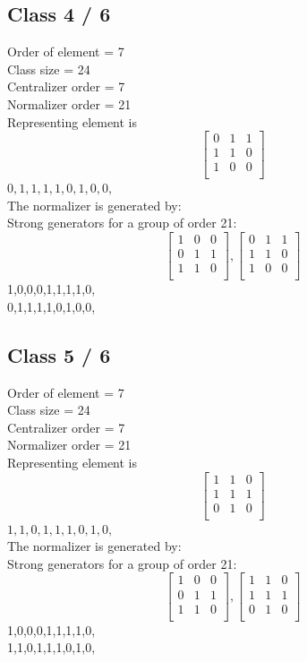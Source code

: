 \subsection*{Class 4 / 6}
Order of element = 7\\
Class size = 24\\
Centralizer order = 7\\
Normalizer order = 21\\
Representing element is
$$
\left[
\begin{array}{*{3}{r}}
0 & 1 & 1\\
1 & 1 & 0\\
1 & 0 & 0\\
\end{array}
\right]
$$
$0,1,1,1,1,0,1,0,0,$\\
The normalizer is generated by:\\
Strong generators for a group of order 21:
$$
\left[
\begin{array}{*{3}{r}}
1 & 0 & 0\\
0 & 1 & 1\\
1 & 1 & 0\\
\end{array}
\right]
, 
\left[
\begin{array}{*{3}{r}}
0 & 1 & 1\\
1 & 1 & 0\\
1 & 0 & 0\\
\end{array}
\right]
$$
1,0,0,0,1,1,1,1,0,\\
0,1,1,1,1,0,1,0,0,\\
\bigskip
\subsection*{Class 5 / 6}
Order of element = 7\\
Class size = 24\\
Centralizer order = 7\\
Normalizer order = 21\\
Representing element is
$$
\left[
\begin{array}{*{3}{r}}
1 & 1 & 0\\
1 & 1 & 1\\
0 & 1 & 0\\
\end{array}
\right]
$$
$1,1,0,1,1,1,0,1,0,$\\
The normalizer is generated by:\\
Strong generators for a group of order 21:
$$
\left[
\begin{array}{*{3}{r}}
1 & 0 & 0\\
0 & 1 & 1\\
1 & 1 & 0\\
\end{array}
\right]
, 
\left[
\begin{array}{*{3}{r}}
1 & 1 & 0\\
1 & 1 & 1\\
0 & 1 & 0\\
\end{array}
\right]
$$
1,0,0,0,1,1,1,1,0,\\
1,1,0,1,1,1,0,1,0,\\


